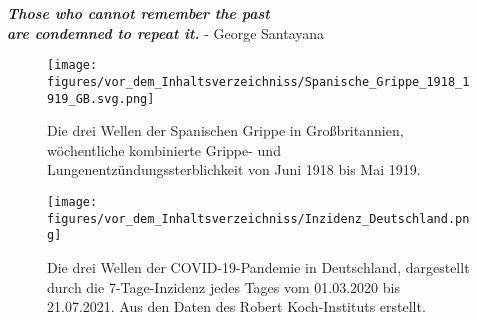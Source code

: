 \vspace*{20pt}
\begin{center}
    \huge{\textbf{
    \textit{Those who cannot remember the past\\ are condemned to repeat it.}}}
    \large{- George Santayana \autocite{history-quoteSantayana}}
\end{center}
\vspace*{50pt}
\begin{figure}[h]
    \centering
    \texttt{[image: figures/vor\_dem\_Inhaltsverzeichniss/Spanische\_Grippe\_1918\_1919\_GB.svg.png]}
    \caption{Die drei Wellen der \glqq{}Spanischen Grippe\grqq{} in Großbritannien, wöchentliche kombinierte Grippe- und Lungenentzündungssterblichkeit von Juni 1918 bis Mai 1919. \autocite{spanischflu}}
    \label{fig:spanishflu}
\end{figure}
\vspace*{10pt}
\begin{figure}[h]
    \centering
    \texttt{[image: figures/vor\_dem\_Inhaltsverzeichniss/Inzidenz\_Deutschland.png]}
    \caption{Die drei Wellen der COVID-19-Pandemie in Deutschland, dargestellt durch die 7-Tage-Inzidenz jedes Tages vom 01.03.2020 bis 21.07.2021. Aus den Daten des Robert Koch-Instituts erstellt.}
    \label{fig:germany_incidence}
\end{figure}
